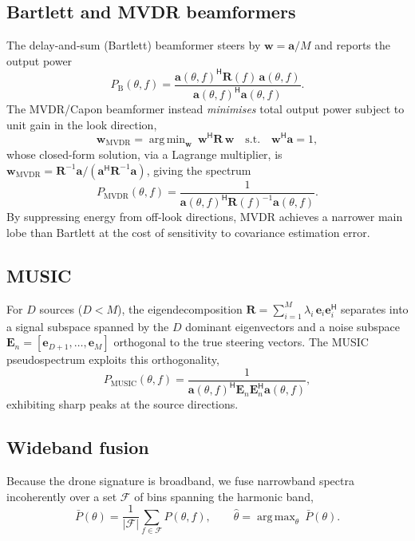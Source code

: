 \documentclass[11pt]{article}
\newcommand{\herm}{^{\mathsf{H}}}
\newcommand{\Rmat}{\mathbf{R}}
\newcommand{\av}{\mathbf{a}}
\newcommand{\wv}{\mathbf{w}}
\DeclareMathOperator*{\argmax}{arg\,max}
\DeclareMathOperator*{\argmin}{arg\,min}
\begin{document}
\subsection{Bartlett and MVDR beamformers}
The delay-and-sum (Bartlett) beamformer steers by $\wv=\av/M$ and reports the
output power
\begin{equation}
P_{\mathrm{B}}(\theta,f) = \frac{\av(\theta,f)\herm \Rmat(f)\,\av(\theta,f)}
{\av(\theta,f)\herm\av(\theta,f)} .
\end{equation}
The MVDR/Capon beamformer instead \emph{minimises} total output power subject to
unit gain in the look direction,
\begin{equation}
\wv_{\mathrm{MVDR}} = \argmin_{\wv}\ \wv\herm\Rmat\,\wv
\quad\text{s.t.}\quad \wv\herm\av = 1,
\end{equation}
whose closed-form solution, via a Lagrange multiplier, is
$\wv_{\mathrm{MVDR}} = \Rmat^{-1}\av/(\av\herm\Rmat^{-1}\av)$, giving the spectrum
\begin{equation}
P_{\mathrm{MVDR}}(\theta,f) = \frac{1}{\av(\theta,f)\herm \Rmat(f)^{-1}\av(\theta,f)} .
\end{equation}
By suppressing energy from off-look directions, MVDR achieves a narrower main
lobe than Bartlett at the cost of sensitivity to covariance estimation error.

\subsection{MUSIC}
For $D$ sources ($D<M$), the eigendecomposition
$\Rmat = \sum_{i=1}^{M}\lambda_i\,\mathbf{e}_i\mathbf{e}_i\herm$ separates into a
signal subspace spanned by the $D$ dominant eigenvectors and a noise subspace
$\mathbf{E}_n=[\mathbf{e}_{D+1},\dots,\mathbf{e}_M]$ orthogonal to the true
steering vectors. The MUSIC pseudospectrum exploits this orthogonality,
\begin{equation}
P_{\mathrm{MUSIC}}(\theta,f) =
\frac{1}{\av(\theta,f)\herm \mathbf{E}_n\mathbf{E}_n\herm \av(\theta,f)},
\label{eq:music}
\end{equation}
exhibiting sharp peaks at the source directions.

\subsection{Wideband fusion}
Because the drone signature is broadband, we fuse narrowband spectra
incoherently over a set $\mathcal{F}$ of bins spanning the harmonic band,
\begin{equation}
\bar{P}(\theta) = \frac{1}{|\mathcal{F}|}\sum_{f\in\mathcal{F}} P(\theta,f),
\qquad
\hat{\theta} = \argmax_{\theta}\ \bar{P}(\theta).
\end{equation}
\end{document}
